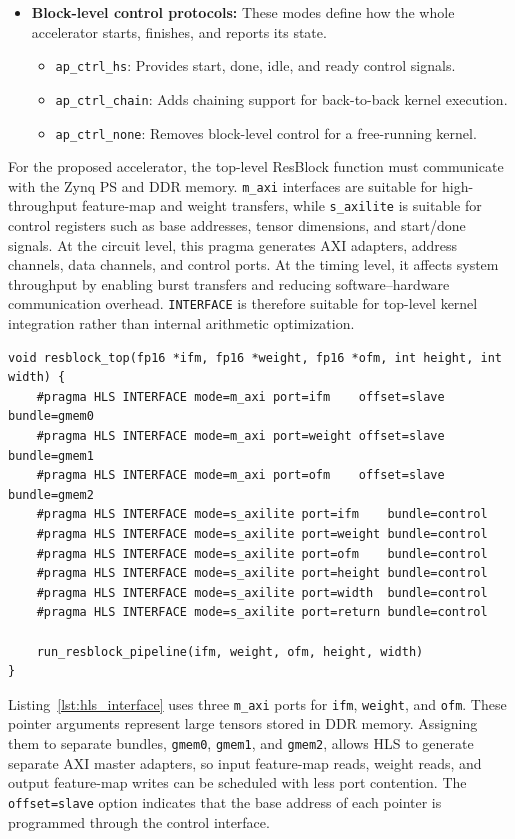 \begin{itemize}
    \item \textbf{Block-level control protocols:} These modes define how the whole accelerator starts, finishes, and reports its state.
    \begin{itemize}
        \item \texttt{ap\_ctrl\_hs}: Provides start, done, idle, and ready control signals.
        \item \texttt{ap\_ctrl\_chain}: Adds chaining support for back-to-back kernel execution.
        \item \texttt{ap\_ctrl\_none}: Removes block-level control for a free-running kernel.
    \end{itemize}
\end{itemize}

For the proposed accelerator, the top-level ResBlock function must communicate with the Zynq PS and DDR memory. \texttt{m\_axi} interfaces are suitable for high-throughput feature-map and weight transfers, while \texttt{s\_axilite} is suitable for control registers such as base addresses, tensor dimensions, and start/done signals. At the circuit level, this pragma generates AXI adapters, address channels, data channels, and control ports. At the timing level, it affects system throughput by enabling burst transfers and reducing software--hardware communication overhead. \texttt{INTERFACE} is therefore suitable for top-level kernel integration rather than internal arithmetic optimization.

\begin{lstlisting}[caption={Pseudo-code for ResBlock top-level AXI interfaces},label={lst:hls_interface}]
void resblock_top(fp16 *ifm, fp16 *weight, fp16 *ofm, int height, int width) {
    #pragma HLS INTERFACE mode=m_axi port=ifm    offset=slave bundle=gmem0
    #pragma HLS INTERFACE mode=m_axi port=weight offset=slave bundle=gmem1
    #pragma HLS INTERFACE mode=m_axi port=ofm    offset=slave bundle=gmem2
    #pragma HLS INTERFACE mode=s_axilite port=ifm    bundle=control
    #pragma HLS INTERFACE mode=s_axilite port=weight bundle=control
    #pragma HLS INTERFACE mode=s_axilite port=ofm    bundle=control
    #pragma HLS INTERFACE mode=s_axilite port=height bundle=control
    #pragma HLS INTERFACE mode=s_axilite port=width  bundle=control
    #pragma HLS INTERFACE mode=s_axilite port=return bundle=control

    run_resblock_pipeline(ifm, weight, ofm, height, width)
}
\end{lstlisting}

Listing~\ref{lst:hls_interface} uses three \texttt{m\_axi} ports for \texttt{ifm}, \texttt{weight}, and \texttt{ofm}. These pointer arguments represent large tensors stored in DDR memory. Assigning them to separate bundles, \texttt{gmem0}, \texttt{gmem1}, and \texttt{gmem2}, allows HLS to generate separate AXI master adapters, so input feature-map reads, weight reads, and output feature-map writes can be scheduled with less port contention. The \texttt{offset=slave} option indicates that the base address of each pointer is programmed through the control interface.

